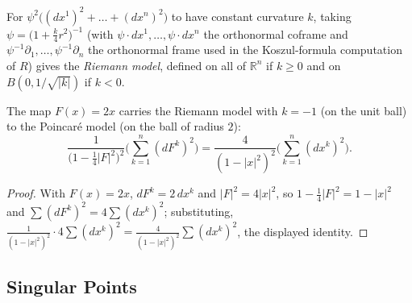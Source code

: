 \begin{remark}
  \label{rem:pet-ch4-riemann-model}
  For $\psi^2\big((dx^1)^2+\dots+(dx^n)^2\big)$ to have constant curvature $k$,
  taking $\psi=\big(1+\tfrac k4r^2\big)^{-1}$ (with $\psi\cdot dx^1,\dots,\psi\cdot dx^n$
  the orthonormal coframe and $\psi^{-1}\partial_1,\dots,\psi^{-1}\partial_n$ the
  orthonormal frame used in the Koszul-formula computation of $R$) gives the
  \emph{Riemann model}, defined on all of $\mathbb{R}^n$ if $k\ge0$ and on
  $B(0,1/\sqrt{|k|})$ if $k<0$.
\end{remark}

\begin{proposition}[the Riemann model with $k=-1$ is isometric to the Poincaré model]
  \label{prop:pet-ch4-riemann-poincare-isometric}
  The map $F(x)=2x$ carries the Riemann model with $k=-1$ (on the unit ball) to
  the Poincaré model (on the ball of radius $2$):
  \[
    \frac1{\big(1-\tfrac14|F|^2\big)^2}\Big(\sum_{k=1}^n(dF^k)^2\Big)
    =\frac4{(1-|x|^2)^2}\Big(\sum_{k=1}^n(dx^k)^2\Big).
  \]
\end{proposition}
\begin{proof}
  With $F(x)=2x$, $dF^k=2\,dx^k$ and $|F|^2=4|x|^2$, so
  $1-\tfrac14|F|^2=1-|x|^2$ and $\sum(dF^k)^2=4\sum(dx^k)^2$; substituting,
  $\tfrac1{(1-|x|^2)^2}\cdot4\sum(dx^k)^2=\tfrac4{(1-|x|^2)^2}\sum(dx^k)^2$, the
  displayed identity.
\end{proof}

\subsection{Singular Points}


